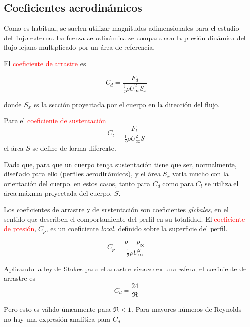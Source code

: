 \subsection{Coeficientes aerodinámicos}

	
	Como es habitual, se suelen utilizar magnitudes adimensionales para
	el estudio del flujo externo. La fuerza aerodinámica se compara con
	la presión dinámica del flujo lejano multiplicado por un área de referencia.
	
	El \textcolor{red}{coeficiente de arrastre} es 
	
\begin{equation}
		C_{d}=\dfrac{F_{d}}{\frac{1}{2}\rho U_{\infty}^{2}S_{x}}
\end{equation}
	
	donde $S_{x}$ es la sección proyectada por el cuerpo en la dirección
	del flujo.
	
	Para el \textcolor{red}{coeficiente de sustentación} 
\begin{equation}
		C_{l}=\dfrac{F_{l}}{\frac{1}{2}\rho U_{\infty}^{2}S}
\end{equation}
el área $S$ se define de forma diferente. 

	
	Dado que, para que un cuerpo tenga sustentación tiene que ser, normalmente,
	diseñado para ello (perfiles aerodinámicos), y el área $S_{x}$ varia
	mucho con la orientación del cuerpo, en estos casos, tanto para $C_{d}$
	como para $C_{l}$ se utiliza el área máxima proyectada del cuerpo,
	$S$.
	
	Los coeficientes de arrastre y de sustentación son coeficientes \textit{globales},
	en el sentido que describen el comportamiento del perfil en su totalidad.
	El \textcolor{red}{coeficiente de presión}, $C_{p}$, es un coeficiente
	\textit{local}, definido sobre la superficie del perfil. 
	
\begin{equation}
		C_{p}=\dfrac{p-p_{\infty}}{\frac{1}{2}\rho U_{\infty}^{2}}
\end{equation}
	
	

	
	Aplicando la ley de Stokes para el arrastre viscoso en una esfera,
	el coeficiente de arrastre es 
\begin{equation}
		C_{d}=\dfrac{24}{\Re}
\end{equation}
	
	Pero esto es válido únicamente para $\Re<1$. Para mayores números
	de Reynolds no hay una expresión analítica para $C_{d}$
	
